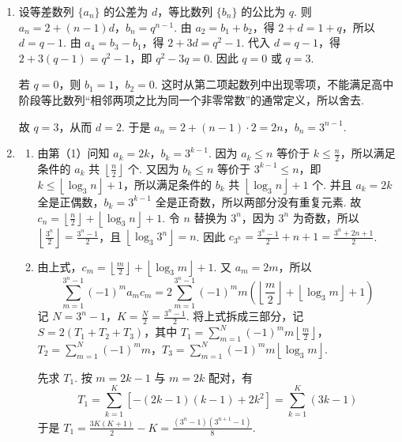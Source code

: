 \documentclass[UTF8,a4paper,oneside,11pt]{ctexbook}
\begin{document}
\begin{solution}
\begin{enumerate}
\item 设等差数列 \(\{a_n\}\) 的公差为 \(d\)，等比数列 \(\{b_n\}\) 的公比为 \(q\). 则 \(a_n=2+\left( n-1 \right)d\)，\(b_n=q^{n-1}\).
由 \(a_2=b_1+b_2\)，得 \(2+d=1+q\)，所以 \(d=q-1\). 由 \(a_4=b_3-b_1\)，得 \(2+3d=q^2-1\). 代入 \(d=q-1\)，得 \(2+3\left( q-1 \right)=q^2-1\)，即 \(q^2-3q=0\). 因此 \(q=0\) 或 \(q=3\).

若 \(q=0\)，则 \(b_1=1\)，\(b_2=0\). 这时从第二项起数列中出现零项，不能满足高中阶段等比数列“相邻两项之比为同一个非零常数”的通常定义，所以舍去.

故 \(q=3\)，从而 \(d=2\). 于是 \(a_n=2+\left( n-1 \right)\cdot 2=2n\)，\(b_n=3^{n-1}\).

\item
\begin{enumerate}
\item 由第（1）问知 \(a_k=2k\)，\(b_k=3^{k-1}\).
因为 \(a_k\le n\) 等价于 \(k\le \frac{n}{2}\)，所以满足条件的 \(a_k\) 共 \(\left\lfloor \frac{n}{2} \right\rfloor\) 个.
又因为 \(b_k\le n\) 等价于 \(3^{k-1}\le n\)，即 \(k\le \left\lfloor \log_3 n \right\rfloor +1\)，所以满足条件的 \(b_k\) 共 \(\left\lfloor \log_3 n \right\rfloor +1\) 个.
并且 \(a_k=2k\) 全是正偶数，\(b_k=3^{k-1}\) 全是正奇数，所以两部分没有重复元素. 故 \(c_n=\left\lfloor \frac{n}{2} \right\rfloor +\left\lfloor \log_3 n \right\rfloor +1\).
令 \(n\) 替换为 \(3^n\)，因为 \(3^n\) 为奇数，所以 \(\left\lfloor \frac{3^n}{2} \right\rfloor =\frac{3^n-1}{2}\)，且 \(\left\lfloor \log_3 3^n \right\rfloor =n\). 因此 \(c_{3^n}=\frac{3^n-1}{2}+n+1=\frac{3^n+2n+1}{2}\).

\item 由上式，\(c_m=\left\lfloor \frac{m}{2} \right\rfloor +\left\lfloor \log_3 m \right\rfloor +1\). 又 \(a_m=2m\)，所以
\[
\sum_{m=1}^{3^n-1}\left( -1 \right)^m a_m c_m
=2\sum_{m=1}^{3^n-1}\left( -1 \right)^m m\left( \left\lfloor \frac{m}{2} \right\rfloor +\left\lfloor \log_3 m \right\rfloor +1 \right)
\]
记 \(N=3^n-1\)，\(K=\frac{N}{2}=\frac{3^n-1}{2}\). 将上式拆成三部分，记 \(S=2\left( T_1+T_2+T_3 \right)\)，其中 \(T_1=\sum_{m=1}^{N}\left( -1 \right)^m m\left\lfloor \frac{m}{2} \right\rfloor\)，\(T_2=\sum_{m=1}^{N}\left( -1 \right)^m m\)，\(T_3=\sum_{m=1}^{N}\left( -1 \right)^m m\left\lfloor \log_3 m \right\rfloor\).

先求 \(T_1\). 按 \(m=2k-1\) 与 \(m=2k\) 配对，有
\[
T_1=\sum_{k=1}^{K}\left[ -\left( 2k-1 \right)\left( k-1 \right)+2k^2 \right]
=\sum_{k=1}^{K}\left( 3k-1 \right)
\]
于是 \(T_1=\frac{3K\left( K+1 \right)}{2}-K=\frac{\left( 3^n-1 \right)\left( 3^{n+1}-1 \right)}{8}\).


\end{enumerate}
\end{enumerate}
\end{solution}
\end{document}

